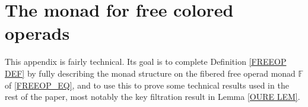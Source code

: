 \documentclass[a4paper,10pt
,draft
]{article}%
\numberwithin{equation}{section}
\numberwithin{figure}{section}
\theoremstyle{definition} %
\newtheorem{remark}[equation]{Remark}%
\newcommand{\V}{\ensuremath{\mathcal V}}
\newcommand{\1}{\ensuremath{\mathbbm 1}}%
\begin{document}


























\appendix


\section{The monad for free colored operads}
\label{MONAD_APDX}

This appendix is fairly technical.
Its goal is to complete Definition \ref{FREEOP DEF}
by fully describing the monad structure 
on the fibered free operad monad $\mathbb{F}$
of \eqref{FREEOP_EQ},
and to use this to prove some technical results used in the rest of the paper, 
most notably the key filtration result in Lemma \ref{OURE LEM}.
\end{document}
